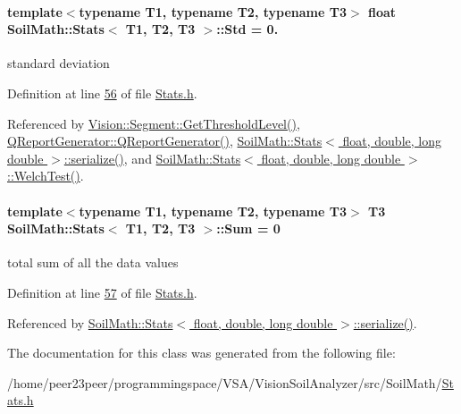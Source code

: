 \paragraph[{Std}]{\setlength{\rightskip}{0pt plus 5cm}template$<$typename T1, typename T2, typename T3$>$ float {\bf Soil\+Math\+::\+Stats}$<$ T1, T2, T3 $>$\+::Std = 0.}\label{class_soil_math_1_1_stats_a6af590b7d033d882d5428c0d7a1f5e59}
standard deviation 

Definition at line \hyperlink{_stats_8h_source_l00056}{56} of file \hyperlink{_stats_8h_source}{Stats.\+h}.



Referenced by \hyperlink{_segment_8cpp_source_l00069}{Vision\+::\+Segment\+::\+Get\+Threshold\+Level()}, \hyperlink{qreportgenerator_8cpp_source_l00004}{Q\+Report\+Generator\+::\+Q\+Report\+Generator()}, \hyperlink{_stats_8h_source_l00651}{Soil\+Math\+::\+Stats$<$ float, double, long double $>$\+::serialize()}, and \hyperlink{_stats_8h_source_l00075}{Soil\+Math\+::\+Stats$<$ float, double, long double $>$\+::\+Welch\+Test()}.

\hypertarget{class_soil_math_1_1_stats_af326fa61048522fc146b799759e345f9}{}
\paragraph[{Sum}]{\setlength{\rightskip}{0pt plus 5cm}template$<$typename T1, typename T2, typename T3$>$ T3 {\bf Soil\+Math\+::\+Stats}$<$ T1, T2, T3 $>$\+::Sum = 0}\label{class_soil_math_1_1_stats_af326fa61048522fc146b799759e345f9}
total sum of all the data values 

Definition at line \hyperlink{_stats_8h_source_l00057}{57} of file \hyperlink{_stats_8h_source}{Stats.\+h}.



Referenced by \hyperlink{_stats_8h_source_l00651}{Soil\+Math\+::\+Stats$<$ float, double, long double $>$\+::serialize()}.



The documentation for this class was generated from the following file\+:\begin{DoxyCompactItemize}
\item 
/home/peer23peer/programmingspace/\+V\+S\+A/\+Vision\+Soil\+Analyzer/src/\+Soil\+Math/\hyperlink{_stats_8h}{Stats.\+h}\end{DoxyCompactItemize}
